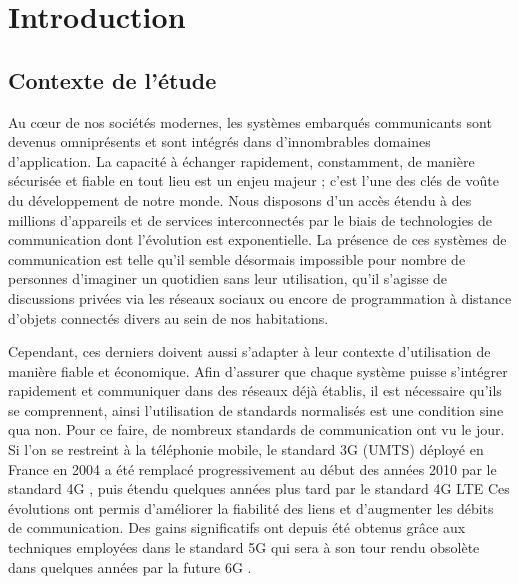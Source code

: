 \documentclass[../main.tex]{subfiles}
\begin{document}
\chapter{Introduction}





\section*{Contexte de l'étude}

Au cœur de nos sociétés modernes, les systèmes embarqués communicants sont devenus omniprésents et sont intégrés dans d'innombrables domaines d'application. La capacité à échanger rapidement, constamment, de manière sécurisée et fiable en tout lieu est un enjeu majeur ; c'est l'une des clés de voûte du développement de notre monde. Nous disposons d'un accès étendu à des millions d'appareils et de services interconnectés par le biais de technologies de communication dont l'évolution est exponentielle. La présence de ces systèmes de communication est telle qu'il semble désormais impossible pour nombre de personnes d'imaginer un quotidien sans leur utilisation, qu'il s'agisse de discussions privées via les réseaux sociaux ou encore de programmation à distance d'objets connectés divers au sein de nos habitations.

Cependant, ces derniers doivent aussi s'adapter à leur contexte d'utilisation de manière fiable et économique.
Afin d'assurer que chaque système puisse s'intégrer rapidement et communiquer dans des réseaux déjà établis, il est nécessaire qu’ils se comprennent, ainsi l'utilisation de standards normalisés est une condition sine qua non.
Pour ce faire, de nombreux standards de communication ont vu le jour.
Si l’on se restreint à la téléphonie mobile, le standard 3G (UMTS) \cite{3G} déployé en France en 2004 a été remplacé progressivement au début des années 2010 par le standard 4G \cite{4G}, puis étendu quelques années plus tard par le standard 4G LTE \cite{Ref_4G}
Ces évolutions ont permis d’améliorer la fiabilité des liens et d’augmenter les débits de communication.
Des gains significatifs ont depuis été obtenus grâce aux techniques employées dans le standard 5G \cite{Ref_5G} qui sera à son tour rendu obsolète dans quelques années par la future 6G \cite{Ref_6G}.
\end{document}
